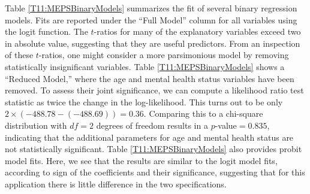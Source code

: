 Table \ref{T11:MEPSBinaryModels} summarizes the fit of several
binary regression models. Fits are reported under the ``Full Model''
column for all variables using the logit function. The $t$-ratios
for many of the explanatory variables exceed two in absolute value,
suggesting that they are useful predictors. From an inspection of
these $t$-ratios, one might consider a more parsimonious model by
removing statistically insignificant variables. Table
\ref{T11:MEPSBinaryModels} shows a ``Reduced Model,'' where the age
and mental health status variables have been removed. To assess
their joint significance, we can compute a likelihood ratio test
statistic as twice the change in the log-likelihood. This turns out
to be only $2\times \left( -488.78-(-488.69)\right) =0.36.$
Comparing this to a chi-square distribution with $df=2$ degrees of
freedom results in a $p$-value$=0.835$, indicating that the
additional parameters for age and mental health status are not
statistically significant. Table \ref{T11:MEPSBinaryModels} also
provides probit model fits. Here, we see that the results are
similar to the logit model fits, according to sign of the
coefficients and their significance, suggesting that for this
application there is little difference in the two specifications.

\bigskip




